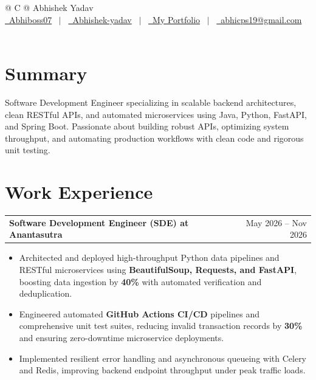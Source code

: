 \documentclass[a4paper,10pt]{article}
\makeatletter
\newenvironment{joblong}[2]
    {
    \begin{tabularx}{\linewidth}{@{}l X r@{}}
    \textbf{#1} & \hfill &  #2 \\[3.50pt]
    \end{tabularx}
    \begin{minipage}[t]{\linewidth}
    \begin{itemize}[nosep,after=\strut, leftmargin=1em, itemsep=3pt,label=--]
    }
    {
    \end{itemize}
    \end{minipage}
    }
\makeatother
\begin{document}
\pagestyle{empty}

\begin{tabularx}{\linewidth}{@{} C @{}}
\Huge{Abhishek Yadav}\\[7.5pt]
\href{https://github.com/Abhiboss07}{\raisebox{-0.05\height}\faGithub\ Abhiboss07} \ $|$ \
\href{https://linkedin.com/in/abhishek-yadav-4738032b7/}{\raisebox{-0.05\height}\faLinkedin\ Abhishek-yadav} \ $|$ \
\href{https://portfolio-abhishek-01.vercel.app}{\raisebox{-0.05\height}\faGlobe \ My Portfolio} \ $|$ \
\href{mailto:abhicps19@gmail.com}{\raisebox{-0.05\height}\faEnvelope \ abhicps19@gmail.com} \ \ \\
\end{tabularx}

\section{Summary}
Software Development Engineer specializing in scalable backend architectures, clean RESTful APIs, and automated microservices using Java, Python, FastAPI, and Spring Boot. Passionate about building robust APIs, optimizing system throughput, and automating production workflows with clean code and rigorous unit testing.

\section{Work Experience}

\begin{joblong}{Software Development Engineer (SDE) at Anantasutra}{May 2026 -- Nov 2026}
\item Architected and deployed high-throughput Python data pipelines and RESTful microservices using \textbf{BeautifulSoup, Requests, and FastAPI}, boosting data ingestion by \textbf{40\%} with automated verification and deduplication.
\item Engineered automated \textbf{GitHub Actions CI/CD} pipelines and comprehensive unit test suites, reducing invalid transaction records by \textbf{30\%} and ensuring zero-downtime microservice deployments.
\item Implemented resilient error handling and asynchronous queueing with Celery and Redis, improving backend endpoint throughput under peak traffic loads.
\end{joblong}
\end{document}
